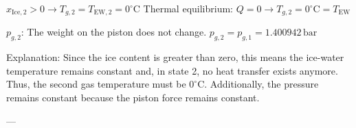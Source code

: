 \( x_{\text{Ice},2} > 0 \rightarrow T_{g,2} = T_{\text{EW},2} = 0^\circ \text{C} \)  
Thermal equilibrium: \( Q = 0 \rightarrow T_{g,2} = 0^\circ \text{C} = T_{\text{EW}} \)  

\( p_{g,2} \): The weight on the piston does not change.  
\( p_{g,2} = p_{g,1} = 1.400942 \, \text{bar} \)  

Explanation: Since the ice content is greater than zero, this means the ice-water temperature remains constant and, in state 2, no heat transfer exists anymore. Thus, the second gas temperature must be \( 0^\circ \text{C} \). Additionally, the pressure remains constant because the piston force remains constant.  

---